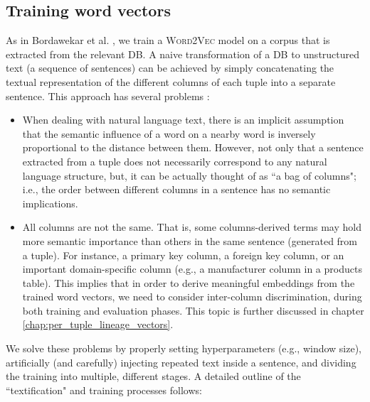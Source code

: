 \subsection{Training word vectors} 
As in Bordawekar et al. \cite{DBLP:journals/corr/BordawekarS16}, we train a \textsc{Word2Vec} model \cite{rehurek_lrec} on a corpus that is extracted from the relevant DB.
A naive transformation of a DB to unstructured text (a sequence of sentences) can be achieved by simply concatenating the textual representation of the different columns of each tuple into a separate sentence. This approach has several problems \cite{DBLP:journals/corr/BordawekarS16}:
\begin{itemize}
    \item When dealing with natural language text, there is an implicit assumption that the semantic influence of a word on a nearby word is inversely proportional to the distance between them. However, not only that a sentence extracted from a tuple does not necessarily correspond to any natural language structure, but, it can be actually thought of as ``a bag of columns"; i.e., the order between different columns in a sentence has no semantic implications.
    \item All columns are not the same. That is, some columns-derived terms may hold more semantic importance than others in the same sentence (generated from a tuple). For instance, a primary key column, a foreign key column, or an important domain-specific column (e.g., a manufacturer column in a products table). This implies that in order to derive meaningful embeddings from the trained word vectors, we need to consider inter-column discrimination, during both training and evaluation phases. This topic is further discussed in chapter \ref{chap:per_tuple_lineage_vectors}.
\end{itemize}
We solve these problems by properly setting hyperparameters (e.g., window size), artificially (and carefully) injecting repeated text inside a sentence, and dividing the training into multiple, different stages. 
A detailed outline of the ``textification" and training processes follows:
